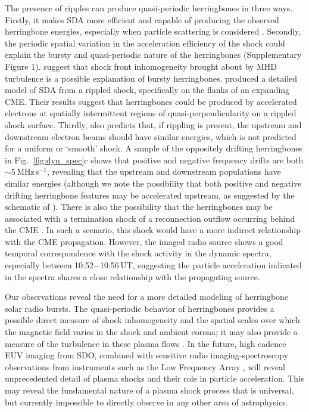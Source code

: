The presence of ripples can produce quasi-periodic herringbones in three ways. Firstly, it makes SDA more efficient and capable of producing the observed herringbone energies, especially when particle scattering is considered \citep{burgess2006}. Secondly, the periodic spatial variation in the acceleration efficiency of the shock could explain the bursty and quasi-periodic nature of the herringbones (Supplementary Figure 1). \cite{guo2010} suggest that shock front inhomogeneity brought about by MHD turbulence is a possible explanation of bursty herringbones. \cite{schmidt2012} produced a detailed model of SDA from a rippled shock, specifically on the flanks of an expanding CME. Their results suggest that herringbones could be produced by accelerated electrons at spatially intermittent regions of quasi-perpendicularity on a rippled shock surface. Thirdly, \citep{burgess2006} also predicts that, if rippling is present, the upstream and downstream electron beams should have similar energies, which is not predicted for a uniform or \textquoteleft smooth' shock. A sample of the oppositely drifting herringbones in Fig.~\ref{fig:dyn_spec}c shows that positive and negative frequency drifts are both $\sim$5\,MHz\,s$^{-1}$, revealing that the upstream and downstream populations have similar energies (although we note the possibility that both positive and negative drifting herringbone features may be accelerated upstream, as suggested by the schematic of \citep{zlobec1993}). There is also the possibility that the herringbones may be associated with a termination shock of a reconnection outflow occurring behind the CME \citep{aurass2004}. In such a scenario, this shock would have a more indirect relationship with the CME propagation. However, the imaged radio source shows a good temporal correspondence with the shock activity in the dynamic spectra, especially between 10:52$-$10:56\,UT, suggesting the particle acceleration indicated in the spectra shares a close relationship with the propagating source.

Our observations reveal the need for a more detailed modeling of herringbone solar radio bursts. The quasi-periodic behavior of herringbones provides a possible direct measure of shock inhomogeneity and the spatial scales over which the magnetic field varies in the shock and ambient corona; it may also provide a measure of the turbulence in these plasma flows \citep{guo2010}. In the future, high cadence EUV imaging from SDO, combined with sensitive radio imaging-spectroscopy observations from instruments such as the Low Frequency Array \citep[LOFAR;][]{vanHaarlem2013}, will reveal unprecedented detail of plasma shocks and their role in particle acceleration. This may reveal the fundamental nature of a plasma shock process that is universal, but currently impossible to directly observe in any other area of astrophysics. 


